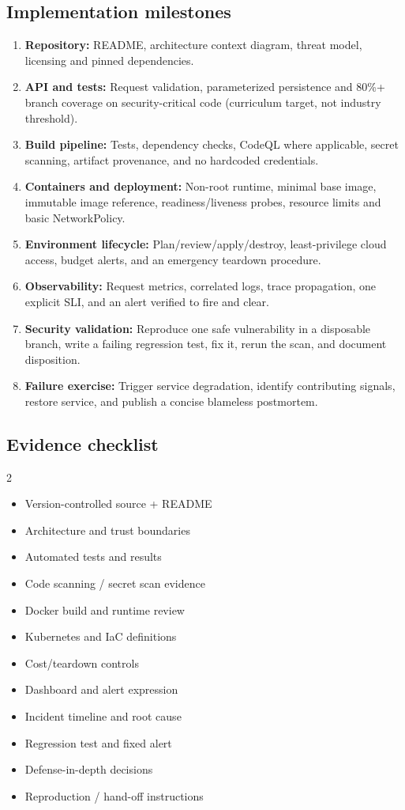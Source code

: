 \documentclass[10pt,letterpaper,oneside]{article}
\begin{document}
\subsection{Implementation milestones}
\begin{enumerate}
\item \textbf{Repository:} README, architecture context diagram, threat model, licensing and pinned dependencies.
\item \textbf{API and tests:} Request validation, parameterized persistence and 80\%+ branch coverage on security-critical code (curriculum target, not industry threshold).
\item \textbf{Build pipeline:} Tests, dependency checks, CodeQL where applicable, secret scanning, artifact provenance, and no hardcoded credentials.
\item \textbf{Containers and deployment:} Non-root runtime, minimal base image, immutable image reference, readiness/liveness probes, resource limits and basic NetworkPolicy.
\item \textbf{Environment lifecycle:} Plan/review/apply/destroy, least-privilege cloud access, budget alerts, and an emergency teardown procedure.
\item \textbf{Observability:} Request metrics, correlated logs, trace propagation, one explicit SLI, and an alert verified to fire and clear.
\item \textbf{Security validation:} Reproduce one safe vulnerability in a disposable branch, write a failing regression test, fix it, rerun the scan, and document disposition.
\item \textbf{Failure exercise:} Trigger service degradation, identify contributing signals, restore service, and publish a concise blameless postmortem.
\end{enumerate}
\subsection{Evidence checklist}
\begin{multicols}{2}
\begin{itemize}[label={\(\square\)}]
\item Version-controlled source + README
\item Architecture and trust boundaries
\item Automated tests and results
\item Code scanning / secret scan evidence
\item Docker build and runtime review
\item Kubernetes and IaC definitions
\item Cost/teardown controls
\item Dashboard and alert expression
\item Incident timeline and root cause
\item Regression test and fixed alert
\item Defense-in-depth decisions
\item Reproduction / hand-off instructions
\end{itemize}
\end{multicols}
\end{document}
